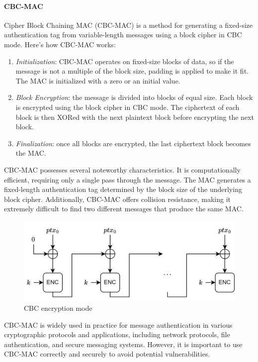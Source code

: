 \paragraph*{CBC-MAC}
Cipher Block Chaining MAC (CBC-MAC) is a method for generating a fixed-size authentication tag from variable-length messages using a block cipher in CBC mode.
Here's how CBC-MAC works:
\begin{enumerate}
    \item \textit{Initialization}: CBC-MAC operates on fixed-size blocks of data, so if the message is not a multiple of the block size, padding is applied to make it fit. 
        The MAC is initialized with a zero or an initial value.
    \item \textit{Block Encryption}: the message is divided into blocks of equal size. 
        Each block is encrypted using the block cipher in CBC mode. 
        The ciphertext of each block is then XORed with the next plaintext block before encrypting the next block.
    \item \textit{Finalization}: once all blocks are encrypted, the last ciphertext block becomes the MAC.
\end{enumerate}
CBC-MAC possesses several noteworthy characteristics. 
It is computationally efficient, requiring only a single pass through the message. 
The MAC generates a fixed-length authentication tag determined by the block size of the underlying block cipher. 
Additionally, CBC-MAC offers collision resistance, making it extremely difficult to find two different messages that produce the same MAC.
\begin{figure}[H]
    \centering
    \includegraphics[width=0.75\linewidth]{images/cbcmac.png}
    \caption{CBC encryption mode}
\end{figure}
CBC-MAC is widely used in practice for message authentication in various cryptographic protocols and applications, including network protocols, file authentication, and secure messaging systems. 
However, it is important to use CBC-MAC correctly and securely to avoid potential vulnerabilities.

